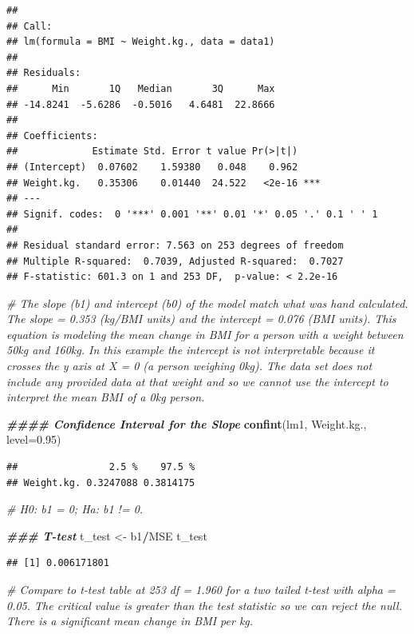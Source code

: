 \documentclass[
]{article}
\newenvironment{Shaded}{\begin{snugshade}}{\end{snugshade}}
\newcommand{\AttributeTok}[1]{\textcolor[rgb]{0.13,0.29,0.53}{#1}}
\newcommand{\CommentTok}[1]{\textcolor[rgb]{0.56,0.35,0.01}{\textit{#1}}}
\newcommand{\DocumentationTok}[1]{\textcolor[rgb]{0.56,0.35,0.01}{\textbf{\textit{#1}}}}
\newcommand{\FloatTok}[1]{\textcolor[rgb]{0.00,0.00,0.81}{#1}}
\newcommand{\FunctionTok}[1]{\textcolor[rgb]{0.13,0.29,0.53}{\textbf{#1}}}
\newcommand{\NormalTok}[1]{#1}
\newcommand{\OtherTok}[1]{\textcolor[rgb]{0.56,0.35,0.01}{#1}}
\newcommand{\SpecialCharTok}[1]{\textcolor[rgb]{0.81,0.36,0.00}{\textbf{#1}}}
\newcommand{\StringTok}[1]{\textcolor[rgb]{0.31,0.60,0.02}{#1}}
\begin{document}
\begin{verbatim}
## 
## Call:
## lm(formula = BMI ~ Weight.kg., data = data1)
## 
## Residuals:
##      Min       1Q   Median       3Q      Max 
## -14.8241  -5.6286  -0.5016   4.6481  22.8666 
## 
## Coefficients:
##             Estimate Std. Error t value Pr(>|t|)    
## (Intercept)  0.07602    1.59380   0.048    0.962    
## Weight.kg.   0.35306    0.01440  24.522   <2e-16 ***
## ---
## Signif. codes:  0 '***' 0.001 '**' 0.01 '*' 0.05 '.' 0.1 ' ' 1
## 
## Residual standard error: 7.563 on 253 degrees of freedom
## Multiple R-squared:  0.7039, Adjusted R-squared:  0.7027 
## F-statistic: 601.3 on 1 and 253 DF,  p-value: < 2.2e-16
\end{verbatim}

\begin{Shaded}
\begin{Highlighting}[]
\CommentTok{\# The slope (b1) and intercept (b0) of the model match what was hand calculated. The slope = 0.353 (kg/BMI units) and the intercept = 0.076 (BMI units). This equation is modeling the mean change in BMI for a person with a weight between 50kg and 160kg. In this example the intercept is not interpretable because it crosses the y axis at X = 0 (a person weighing 0kg). The data set does not include any provided data at that weight and so we cannot use the intercept to interpret the mean BMI of a 0kg person.}

\DocumentationTok{\#\#\#\# Confidence Interval for the Slope}
\FunctionTok{confint}\NormalTok{(lm1, }\StringTok{\textquotesingle{}Weight.kg.\textquotesingle{}}\NormalTok{, }\AttributeTok{level=}\FloatTok{0.95}\NormalTok{)}
\end{Highlighting}
\end{Shaded}

\begin{verbatim}
##                2.5 %    97.5 %
## Weight.kg. 0.3247088 0.3814175
\end{verbatim}

\begin{Shaded}
\begin{Highlighting}[]
\CommentTok{\# H0: b1 = 0; Ha: b1 != 0.}

\DocumentationTok{\#\#\# T{-}test}
\NormalTok{t\_test }\OtherTok{\textless{}{-}}\NormalTok{ b1}\SpecialCharTok{/}\NormalTok{MSE}
\NormalTok{t\_test}
\end{Highlighting}
\end{Shaded}

\begin{verbatim}
## [1] 0.006171801
\end{verbatim}

\begin{Shaded}
\begin{Highlighting}[]
\CommentTok{\# Compare to t{-}test table at 253 df = 1.960 for a two tailed t{-}test with alpha = 0.05. The critical value is greater than the test statistic so we can reject the null. There is a significant mean change in BMI per kg.}
\end{Highlighting}
\end{Shaded}
\end{document}
